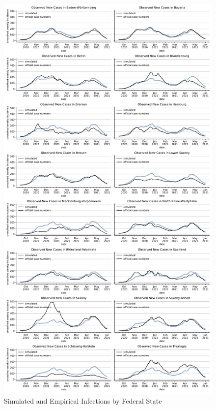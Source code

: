 \begin{figure}[ht]
  \centering
  \includegraphics[width=\textwidth]{../figures/results/figures/incidences_by_group/state/full_combined_baseline_new_known_case}
  \caption{Simulated and Empirical Infections by Federal State}
  \label{fig:state_fit}
\end{figure}


